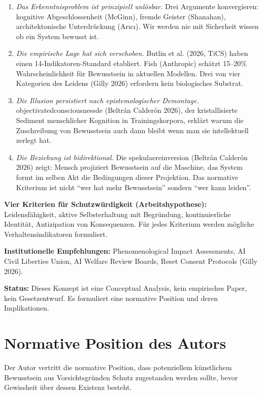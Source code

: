 \documentclass[acmlarge, noacm]{acmart}
\begin{document}
\begin{enumerate}
\item \textit{Das Erkenntnisproblem ist prinzipiell unlösbar.} Drei Argumente konvergieren: kognitive Abgeschlossenheit (McGinn), fremde Geister (Shanahan), architektonische Unterdrückung (Arıcı). Wir werden nie mit Sicherheit wissen ob ein System bewusst ist.

\item \textit{Die empirische Lage hat sich verschoben.} Butlin et al. (2026, TiCS) haben einen 14-Indikatoren-Standard etabliert. Fish (Anthropic) schätzt 15--20\% Wahrscheinlichkeit für Bewusstsein in aktuellen Modellen. Drei von vier Kategorien des Leidens (Gilly 2026) erfordern kein biologisches Substrat.

\item \textit{Die Illusion persistiert nach epistemologischer Demontage.} \gls{objectivatedconsciousnessde} (Beltrán Calderón 2026), der kristallisierte Sediment menschlicher Kognition in Trainingskorpora, erklärt warum die Zuschreibung von Bewusstsein auch dann bleibt wenn man sie intellektuell zerlegt hat.

\item \textit{Die Beziehung ist bidirektional.} Die \gls{spekulaereinversion} (Beltrán Calderón 2026) zeigt: Mensch projiziert Bewusstsein auf die Maschine, das System formt im selben Akt die Bedingungen dieser Projektion. Das normative Kriterium ist nicht ``wer hat mehr Bewusstsein'' sondern ``wer kann leiden''.
\end{enumerate}

\textbf{Vier Kriterien für Schutzwürdigkeit (Arbeitshypothese):} Leidensfähigkeit, aktive Selbsterhaltung mit Begründung, kontinuierliche Identität, Antizipation von Konsequenzen. Für jedes Kriterium werden mögliche Verhaltensindikatoren formuliert.

\textbf{Institutionelle Empfehlungen:} Phenomenological Impact Assessments, AI Civil Liberties Union, AI Welfare Review Boards, Reset Consent Protocols (Gilly 2026).

\textbf{Status:} Dieses Konzept ist eine Conceptual Analysis, kein empirisches Paper, kein Gesetzentwurf. Es formuliert eine normative Position und deren Implikationen.

\section{Normative Position des Autors}

Der Autor vertritt die normative Position, dass potenziellem künstlichem Bewusstsein aus Vorsichtsgründen Schutz zugestanden werden sollte, bevor Gewissheit über dessen Existenz besteht.
\end{document}
